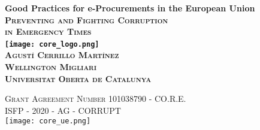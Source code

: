 \documentclass[a4paper, twoside]{report}
\begin{document}
\hyphenation{}

\begin{titlepage}


	\begin{center}
	\vspace{7cm}

	\huge\bfseries{Good Practices for e-Procurements in the European Union}\\
	\vspace{0.5cm}
	\textsc{\large Preventing and Fighting Corruption}\\
			 \vspace{-0.5cm}
	\textsc{\large in Emergency Times}\\
		\vspace{3cm}
			 \texttt{[image: core\_logo.png]}~\\[1cm]
		 \textsc{\small Agustí Cerrillo Martínez}\\
		 \vspace{-0.5cm}
		  \textsc{\small Wellington Migliari}\\
		  	\vspace{2cm}
		    \textsc{\small Universitat Oberta de Catalunya}

	\end{center}
	\vspace{-1cm}
	\begin{center}

	\end{center}
	\begin{center}
	 \textsc{\small Grant Agreement Number 101038790 - CO.R.E.\\ ISFP - 2020 - AG - CORRUPT}\\
	 	\vspace{0.5cm}
	  \texttt{[image: core\_ue.png]}
	\end{center}
	
\end{titlepage}
\end{document}

